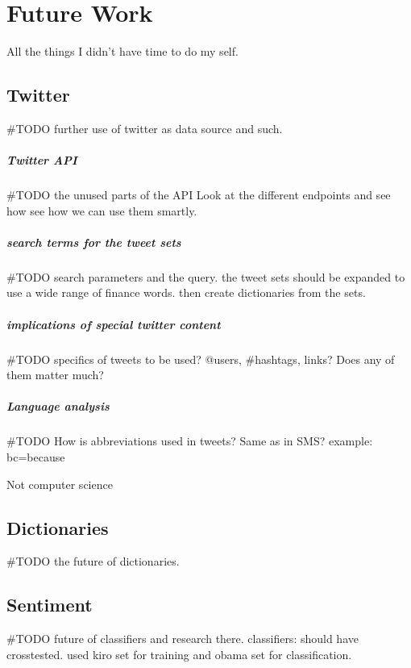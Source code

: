 \chapter{Future Work}\label{future_work}
All the things I didn't have time to do my self. 
%

\section{Twitter}
#TODO further use of twitter as data source and such.  

\paragraph{Twitter API}
#TODO the unused parts of the API
Look at the different endpoints and see how see how we can use them smartly.

\paragraph{search terms for the tweet sets}
#TODO search parameters and the query.
the tweet sets should be expanded to use a wide range of finance words. then
create dictionaries from the sets. 

\paragraph{implications of special twitter content}
#TODO specifics of tweets to be used?
@users, #hashtags, links? Does any of them matter much?

\paragraph{Language analysis}
#TODO How is abbreviations used in tweets? Same as in SMS?
example: bc=because

Not computer science
%

\section{Dictionaries}
#TODO the future of dictionaries.
%

\section{Sentiment}
#TODO future of classifiers and research there.
classifiers:
should have crosstested. used kiro set for training and obama set for
classification.

